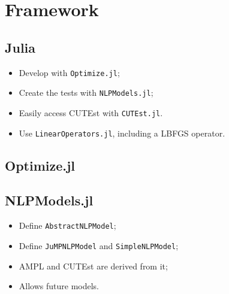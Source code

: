 \section{Framework}

\subsection{Julia}


\begin{frame}[fragile]
  \begin{itemize}
    \item Develop with \texttt{Optimize.jl};
    \item Create the tests with \texttt{NLPModels.jl};
    \item Easily access CUTEst with \texttt{CUTEst.jl}.
    \item Use \texttt{LinearOperators.jl}, including a LBFGS
      operator.
  \end{itemize}
\end{frame}

\subsection{Optimize.jl}


\subsection{NLPModels.jl}

\begin{frame}[fragile]
  \begin{itemize}
    \item Define \texttt{AbstractNLPModel};
    \item Define \texttt{JuMPNLPModel} and
      \texttt{SimpleNLPModel};
    \item AMPL and CUTEst are derived from it;
    \item Allows future models.
  \end{itemize}
\end{frame}

